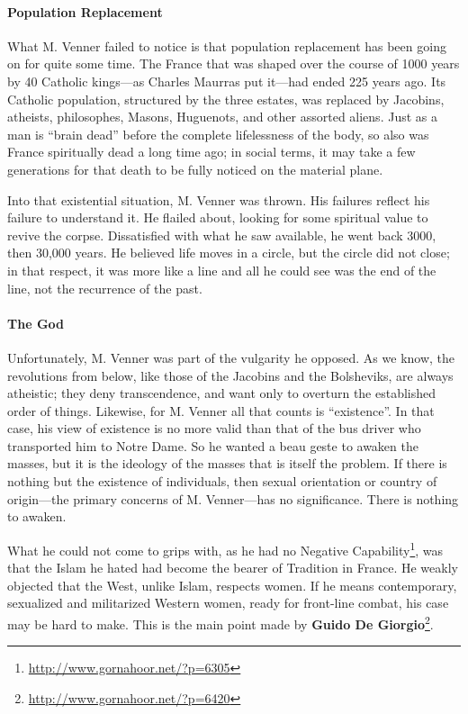 \paragraph{Population Replacement}


What M. Venner failed to notice is that population replacement has been going on for quite some time. The France that was shaped over the course of 1000 years by 40 Catholic kings---as Charles Maurras put it---had ended 225 years ago. Its Catholic population, structured by the three estates, was replaced by Jacobins, atheists, philosophes, Masons, Huguenots, and other assorted aliens. Just as a man is ``brain dead'' before the complete lifelessness of the body, so also was France spiritually dead a long time ago; in social terms, it may take a few generations for that death to be fully noticed on the material plane.

Into that existential situation, M. Venner was thrown. His failures reflect his failure to understand it. He flailed about, looking for some spiritual value to revive the corpse. Dissatisfied with what he saw available, he went back 3000, then 30,000 years. He believed life moves in a circle, but the circle did not close; in that respect, it was more like a line and all he could see was the end of the line, not the recurrence of the past.

\paragraph{The God}


Unfortunately, M. Venner was part of the vulgarity he opposed. As we know, the revolutions from below, like those of the Jacobins and the Bolsheviks, are always atheistic; they deny transcendence, and want only to overturn the established order of things. Likewise, for M. Venner all that counts is ``existence''. In that case, his view of existence is no more valid than that of the bus driver who transported him to Notre Dame. So he wanted a beau geste to awaken the masses, but it is the ideology of the masses that is itself the problem. If there is nothing but the existence of individuals, then sexual orientation or country of origin---the primary concerns of M. Venner---has no significance. There is nothing to awaken.

What he could not come to grips with, as he had no Negative Capability\footnote{\url{http://www.gornahoor.net/?p=6305}}, was that the Islam he hated had become the bearer of Tradition in France. He weakly objected that the West, unlike Islam, respects women. If he means contemporary, sexualized and militarized Western women, ready for front-line combat, his case may be hard to make. This is the main point made by \textbf{Guido De Giorgio}\footnote{\url{http://www.gornahoor.net/?p=6420}}.

